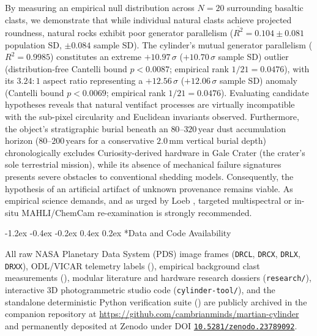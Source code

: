 \documentclass[11pt,a4paper]{article}
\makeatletter
\renewcommand\section{\@startsection {section}{1}{\z@}%
                                   {-1.2ex \@plus -0.4ex \@minus -0.2ex}%
                                   {0.4ex \@plus 0.2ex}%
                                   {\normalfont\large\bfseries}}
\makeatother
\begin{document}
By measuring an empirical null distribution across $N = 20$ surrounding basaltic clasts, we demonstrate that while individual natural clasts achieve projected roundness, natural rocks exhibit poor generator parallelism ($\overline{R^2} = 0.104 \pm 0.081$ population SD, $\pm 0.084$ sample SD). The cylinder's mutual generator parallelism ($R^2 = 0.9985$) constitutes an extreme $+10.97\,\sigma$ ($+10.70\,\sigma$ sample SD) outlier (distribution-free Cantelli bound $p < 0.0087$; empirical rank $1/21 = 0.0476$), with its $3.24:1$ aspect ratio representing a $+12.56\,\sigma$ ($+12.06\,\sigma$ sample SD) anomaly (Cantelli bound $p < 0.0069$; empirical rank $1/21 = 0.0476$). Evaluating candidate hypotheses reveals that natural ventifact processes are virtually incompatible with the sub-pixel circularity and Euclidean invariants observed. Furthermore, the object's stratigraphic burial beneath an $80\text{--}320\,\text{year}$ dust accumulation horizon ($80\text{--}200\,\text{years}$ for a conservative $2.0\,\text{mm}$ vertical burial depth) chronologically excludes Curiosity-derived hardware in Gale Crater (the crater's sole terrestrial mission), while its absence of mechanical failure signatures presents severe obstacles to conventional shedding models. Consequently, the hypothesis of an artificial artifact of unknown provenance remains viable. As empirical science demands, and as urged by Loeb \cite{loeb2026}, targeted multispectral or in-situ MAHLI/ChemCam re-examination is strongly recommended.

\section*{Data and Code Availability}

All raw NASA Planetary Data System (PDS) image frames (\texttt{DRCL}, \texttt{DRCX}, \texttt{DRLX}, \texttt{DRXX}), ODL/VICAR telemetry labels (), empirical background clast measurements (), modular literature and hardware research dossiers (\texttt{research/}), interactive 3D photogrammetric studio code (\texttt{cylinder-tool/}), and the standalone deterministic Python verification suite () are publicly archived in the companion repository at \url{https://github.com/cambrianminds/martian-cylinder} and permanently deposited at Zenodo under DOI \href{https://doi.org/10.5281/zenodo.23789092}{\texttt{10.5281/zenodo.23789092}}.
\end{document}
